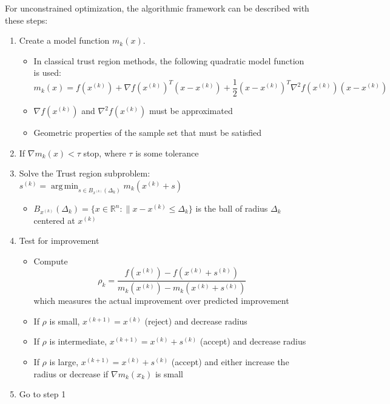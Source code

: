 \documentclass{article}
\DeclareMathOperator*{\argmin}{arg\,min}
\begin{document}
For unconstrained optimization, the algorithmic framework can be described with these steps:

\begin{enumerate}
	\item Create a model function $m_k(x)$.
	\begin {itemize}
		\item In classical trust region methods, the following quadratic model function is used:
		\[
		m_k(x) = f(x^{(k)}) + \nabla f(x^{(k)})^T (x-x^{(k)}) + \frac 1 2 (x-x^{(k)})^T\nabla^2f(x^{(k)})(x-x^{(k)})
		\]
	\end{itemize}
	\begin{itemize}
		\item $\nabla f(x^{(k)})$ and $\nabla^2 f(x^{(k)})$ must be approximated
		\item Geometric properties of the sample set that must be satisfied
	\end{itemize}
	
	\item If $\nabla m_k(x) < \tau$ stop, where $\tau$ is some tolerance
	
	\item Solve the Trust region subproblem: $s^{(k)} = \argmin_{s\in B_{x^{(k)}}( \Delta_k)} m_k(x^{(k)} + s)$
	\begin {itemize}
		\item $B_{x^{(k)}}(\Delta_k) = \{ x \in \mathbb{R}^n : \| x - x^{(k)} \le \Delta_k \}$ 
		is the ball of radius $\Delta_k$ centered at $x^{(k)}$
	\end{itemize}
	
	\item Test for improvement
	\begin{itemize}
		\item Compute
\begin{equation}
\label{rho}
\rho_k = \frac{f(x^{(k)}) - f(x^{(k)}+s^{(k)})}{m_k(x^{(k)}) - m_k(x^{(k)}+s^{(k)})}
\end{equation}
which measures the actual improvement over predicted improvement
		\item If $\rho$ is small, $x^{(k+1)}=x^{(k)}$ (reject) and decrease radius
		\item If $\rho$ is intermediate, $x^{(k+1)}=x^{(k)}+s^{(k)}$ (accept) and decrease radius
		\item If $\rho$ is large, $x^{(k+1)}=x^{(k)}+s^{(k)}$ (accept) and either increase the radius or decrease if $\nabla m_k(x_k)$ is small
	\end{itemize}
	
	\item Go to step 1
\end{enumerate}
\end{document}
